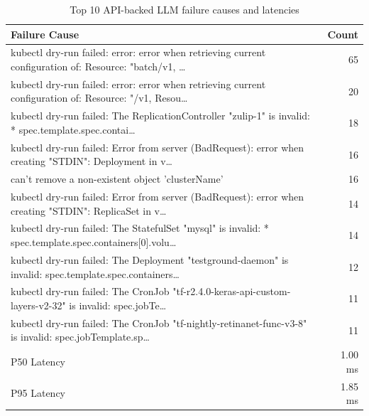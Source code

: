 \begin{table}[ht]
\centering
\caption{Top 10 API-backed LLM failure causes and latencies}
\label{tab:grok_failures}
\small
\begin{tabularx}{\columnwidth}{>{\raggedright\arraybackslash}X r}
\toprule
\textbf{Failure Cause} & \textbf{Count} \\
\midrule
kubectl dry-run failed: error: error when retrieving current configuration of: Resource: "batch/v1, \dots & 65 \\
\midrule
kubectl dry-run failed: error: error when retrieving current configuration of: Resource: "/v1, Resou\dots & 20 \\
\midrule
kubectl dry-run failed: The ReplicationController "zulip-1" is invalid:  * spec.template.spec.contai\dots & 18 \\
\midrule
kubectl dry-run failed: Error from server (BadRequest): error when creating "STDIN": Deployment in v\dots & 16 \\
\midrule
can't remove a non-existent object 'clusterName' & 16 \\
\midrule
kubectl dry-run failed: Error from server (BadRequest): error when creating "STDIN": ReplicaSet in v\dots & 14 \\
\midrule
kubectl dry-run failed: The StatefulSet "mysql" is invalid:  * spec.template.spec.containers[0].volu\dots & 14 \\
\midrule
kubectl dry-run failed: The Deployment "testground-daemon" is invalid: spec.template.spec.containers\dots & 12 \\
\midrule
kubectl dry-run failed: The CronJob "tf-r2.4.0-keras-api-custom-layers-v2-32" is invalid: spec.jobTe\dots & 11 \\
\midrule
kubectl dry-run failed: The CronJob "tf-nightly-retinanet-func-v3-8" is invalid: spec.jobTemplate.sp\dots & 11 \\
\midrule
P50 Latency & 1.00 ms \\
\midrule
P95 Latency & 1.85 ms \\
\bottomrule
\end{tabularx}
\end{table}

